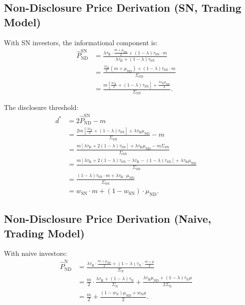 \documentclass[12pt]{article}
\theoremstyle{plain}
\theoremstyle{definition}
\newcommand{\ND}{\mathrm{ND}}
\newcommand{\R}{\mathrm{R}}
\newcommand{\SN}{\mathrm{SN}}
\newcommand{\N}{\mathrm{N}}
\begin{document}
\subsection{Non-Disclosure Price Derivation (SN, Trading Model)}

With SN investors, the informational component is:
\begin{align*}
\hat{P}_{\ND}^\SN &= \frac{\lambda\tau_\R \cdot \frac{m + \mu_{\ND}}{2} + (1-\lambda)\tau_\SN \cdot m}{\lambda\tau_\R + (1-\lambda)\tau_\SN} \\[4pt]
&= \frac{\frac{\lambda\tau_\R}{2}(m + \mu_{\ND}) + (1-\lambda)\tau_\SN \cdot m}{\Sigma_\SN} \\[4pt]
&= \frac{m\left[\frac{\lambda\tau_\R}{2} + (1-\lambda)\tau_\SN\right] + \frac{\lambda\tau_\R\mu_{\ND}}{2}}{\Sigma_\SN}.
\end{align*}

The disclosure threshold:
\begin{align*}
d^* &= 2\hat{P}_{\ND}^\SN - m \\
&= \frac{2m\left[\frac{\lambda\tau_\R}{2} + (1-\lambda)\tau_\SN\right] + \lambda\tau_\R\mu_{\ND}}{\Sigma_\SN} - m \\
&= \frac{m[\lambda\tau_\R + 2(1-\lambda)\tau_\SN] + \lambda\tau_\R\mu_{\ND} - m\Sigma_\SN}{\Sigma_\SN} \\
&= \frac{m[\lambda\tau_\R + 2(1-\lambda)\tau_\SN - \lambda\tau_\R - (1-\lambda)\tau_\SN] + \lambda\tau_\R\mu_{\ND}}{\Sigma_\SN} \\
&= \frac{(1-\lambda)\tau_\SN \cdot m + \lambda\tau_\R \cdot \mu_{\ND}}{\Sigma_\SN} \\
&= w_\SN \cdot m + (1 - w_\SN) \cdot \mu_{\ND}.
\end{align*}

\subsection{Non-Disclosure Price Derivation (Naive, Trading Model)}

With naive investors:
\begin{align*}
\hat{P}_{\ND}^\N &= \frac{\lambda\tau_\R \cdot \frac{m + \mu_{\ND}}{2} + (1-\lambda)\tau_\N \cdot \frac{m + \mu}{2}}{\Sigma_\N} \\[4pt]
&= \frac{m}{2} \cdot \frac{\lambda\tau_\R + (1-\lambda)\tau_\N}{\Sigma_\N} + \frac{\lambda\tau_\R\mu_{\ND} + (1-\lambda)\tau_\N\mu}{2\Sigma_\N} \\[4pt]
&= \frac{m}{2} + \frac{(1-w_\N)\mu_{\ND} + w_\N\mu}{2}.
\end{align*}
\end{document}
